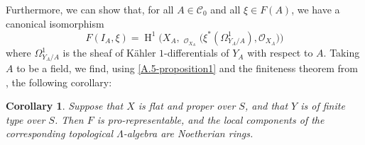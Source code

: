 \documentclass{article}
\theoremstyle{plain}
\newtheorem*{corollary*}{Corollary}
\theoremstyle{definition}
\newcommand{\sh}[1]{{\mathscr{#1}}}
\newcommand{\cat}[1]{{\mathcal{#1}}}
\DeclareMathOperator{\Hom}{Hom}
\DeclareMathOperator{\shHom}{\underline{\Hom}}
\DeclareMathOperator{\HH}{H}
\begin{document}
Furthermore, we can show that, for all $A\in\cat{C}_0$ and all $\xi\in F(A)$, we have a canonical isomorphism
\[
  F(I_A,\xi) = \HH^1\Big(X_A,\shHom_{\sh{O}_{X_A}}\big(\xi^*(\Omega_{Y_A/A}^1),\sh{O}_{X_A}\big)\Big)
\]
where $\Omega_{Y_A/A}^1$ is the sheaf of K\"{a}hler $1$-differentials of $Y_A$ with respect to $A$.
Taking $A$ to be a field, we find, using \cref{A.5-proposition1} and the finiteness theorem from \cite{2}, the following corollary:

\begin{corollary*}
  Suppose that $X$ is flat and proper over $S$, and that $Y$ is of finite type over $S$.
  Then $F$ is pro-representable, and the local components of the corresponding topological $\Lambda$-algebra are \emph{Noetherian} rings.
\end{corollary*}
\end{document}

